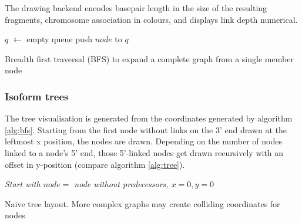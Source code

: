 \documentclass[11pt]{article}
\begin{document}
The drawing backend encodes basepair length in the size of the resulting fragments, chromosome
association in colours, and displays link depth numerical.

\begin{algorithm}  \label{alg:bfs}
  \DontPrintSemicolon
  $q$ $\leftarrow$ empty queue\;
  push $node$ to $q$\;
  \caption[BFS graph seed traversal]{Breadth first traversal (BFS) to expand a complete graph from a single member node}
\end{algorithm}

\subsubsection{Isoform trees}
\label{sec-2-4-1}
\label{txt:tree2}

The tree visualisation is generated from the coordinates generated by algorithm \ref{alg:bfs}.
Starting from the first node without links on the 3' end drawn at the leftmost x position, 
the nodes are drawn. Depending on the number of nodes linked to a node's 5' end, those 5'-linked
nodes get drawn recursively with an offset in y-position (compare algorithm \ref{alg:tree}).


\begin{algorithm}
\label{alg:tree}
\DontPrintSemicolon
{}
\BlankLine
\emph{Start with $node =$ node without predecessors, $x=0, y=0$}
\BlankLine

\caption[Naive tree layout]{Naive tree layout. More complex graphs may create colliding coordinates for nodes}
\end{algorithm}
\end{document}
